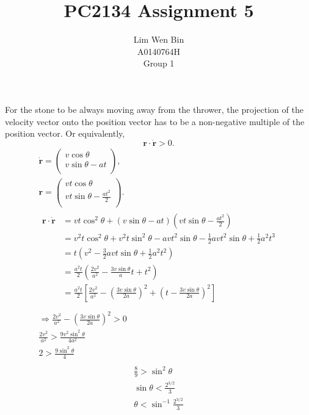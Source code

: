 \documentclass[12pt]{article}
\newenvironment{problem}[2][Problem]{\begin{trivlist}
\item[\hskip \labelsep {\bfseries #1}\hskip \labelsep {\bfseries #2.}]}{\end{trivlist}}
\begin{document}
\title{PC2134 Assignment 5}
\author{Lim Wen Bin \\
A0140764H\\
Group 1}
\maketitle

\begin{problem}{1}
\end{problem}
For the stone to be always moving away from the thrower, the projection of the
velocity vector onto the position vector has to be a non-negative multiple of
the position vector. Or equivalently,
\[\mathbf{r} \cdot \mathbf{\dot{r}} > 0. \]
\begin{gather*}
	\mathbf{\dot{r}} = \left(\begin{array}{c} 
			v\cos\theta \\
			v\sin\theta - at \\
		\end{array} \right), \\
	\mathbf{r} = \left(\begin{array}{c} 
			vt\cos\theta \\
			vt\sin\theta - \frac{at^2}{2} \\
		\end{array} \right). \\
	\begin{aligned}
		\mathbf{r} \cdot \mathbf{\dot{r}} &= vt\cos^2\theta + (v\sin\theta-at)
			\left(vt\sin\theta-\frac{at^2}{2}\right) \\
		&= v^2t\cos^2\theta + v^2t\sin^2\theta  - avt^2\sin\theta -
			\frac{1}{2}avt^2\sin\theta + \frac{1}{2}a^2t^3 \\
		&= t \left( v^2 - \frac{3}{2}avt\sin\theta + \frac{1}{2}a^2t^2 \right) \\ 
		&=  \frac{a^2t}{2} \left( \frac{2v^2}{a^2} - \frac{3v\sin\theta}{a}t +
			t^2 \right) \\ 
		&=  \frac{a^2t}{2} \left[ 
			\frac{2v^2}{a^2} - \left(\frac{3v\sin\theta}{2a}\right)^2 + \left(t
			- \frac{3v\sin\theta}{2a}\right)^2
			\right] \\ 
	\end{aligned}
	\\
	\Rightarrow \frac{2v^2}{a^2} - \left(\frac{3v\sin\theta}{2a}\right)^2 > 0 \\
	\frac{2v^2}{a^2} > \frac{9v^2\sin^2\theta}{4a^2} \\
	2 > \frac{9\sin^2\theta}{4} \\
\end{gather*}
\begin{gather*}
	\frac{8}{9} > \sin^2\theta \\
	\sin\theta < \frac{2^{3/2}}{3} \\
	\theta < \sin^{-1} \frac{2^{3/2}}{3} \\
\end{gather*}
\filbreak
\end{document}
